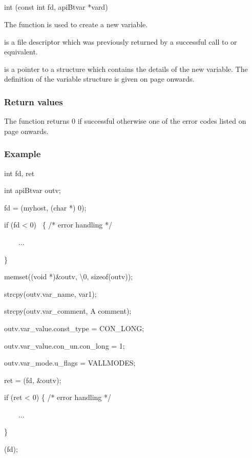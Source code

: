 \subsection{\funcnameXBvaradd{}}

\begin{expara}

int \funcnameXBvaradd{}(const int fd, apiBtvar *vard)

\end{expara}

The function \funcXBvaradd{} is used to create a new
variable.

 is a file descriptor which was previously
returned by a successful call to \funcXBopen{} or equivalent.

 is a pointer to a structure which contains
the details of the new variable. The definition of the variable
structure is given on page \pageref{bkm:Varstructure} onwards.

\subsubsection{Return values}
The function returns 0 if successful otherwise one of the error codes
listed on page \pageref{errorcodes} onwards.

\subsubsection{Example}

\begin{expara}

int fd, ret

int apiBtvar outv;

\bigskip


fd = \funcnameXBopen{}({\textquotedbl}myhost{\textquotedbl}, (char *) 0);

if (fd {\textless} 0) \ \{ /* error handling */

\ \ \ \ ...

\}

memset((void *)\&outv,
{\textquotesingle}{\textbackslash}0{\textquotesingle}, sizeof(outv));

strcpy(outv.var\_name, {\textquotedbl}var1{\textquotedbl});

strcpy(outv.var\_comment, {\textquotedbl}A comment{\textquotedbl});

outv.var\_value.const\_type = CON\_LONG;

outv.var\_value.con\_un.con\_long = 1;

outv.var\_mode.u\_flags = VALLMODES;

ret = \funcnameXBvaradd{}(fd, \&outv);

if (ret {\textless} 0) \{ /* error handling */

\ \ \ \ ...

\}

\funcnameXBclose{}(fd);

\end{expara}

